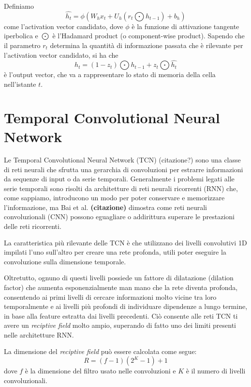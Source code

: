 Definiamo
\begin{equation}
	\hat{h_{t}} = \phi(W_{h}x_{t}+U_{h}(r_{t} \bigodot h_{t-1})+b_{h})
\end{equation}
come l'activation vector candidato, dove $\phi$ è la funzione di attivazione tangente iperbolica e $\bigodot$ è l'Hadamard product (o component-wise product).
Sapendo che il parametro $r_{t}$ determina la quantità di informazione passata che è rilevante per l'activation vector candidato, si ha che
\begin{equation}
	h_{t} = (1-z_{t}) \bigodot h_{t-1}+z_{t} \bigodot \hat{h_{t}} 
\end{equation}
è l'output vector, che va a rappresentare lo stato di memoria della cella nell'istante $t$.

\section{Temporal Convolutional Neural Network}
Le Temporal Convolutional Neural Network (TCN) (citazione?) sono una classe di reti neurali che sfrutta una gerarchia di convoluzioni per estrarre informazioni da sequenze di input o da serie temporali.
Generalmente i problemi legati alle serie temporali sono risolti da architetture di reti neurali ricorrenti (RNN) che, come sappiamo, introducono un modo per poter conservare e memorizzare l'informazione, ma Bai et al. \textbf{(citazione)} dimostra come reti neurali convoluzionali (CNN) possono eguagliare o addirittura superare le prestazioni delle reti ricorrenti.

La caratteristica più rilevante delle TCN è che utilizzano dei livelli convolutivi 1D impilati l'uno sull'altro per creare una rete profonda, utili poter eseguire la convoluzione sulla dimensione temporale.

Oltretutto, ognuno di questi livelli possiede un fattore di dilatazione (dilation factor) che aumenta esponenzialmente man mano che la rete diventa profonda, consentendo ai primi livelli di cercare informazioni molto vicine tra loro temporalmente e ai livelli più profondi di individuare dipendenze a lungo termine, in base alla feature estratta dai livelli precedenti. Ciò consente alle reti TCN ti avere un \textit{reciptive field} molto ampio, superando di fatto uno dei limiti presenti nelle architetture RNN. 

La dimensione del \textit{reciptive field} può essere calcolata come segue:
\begin{equation}
	R = (f-1)(2^K-1)+1
\end{equation}
dove $f$ è la dimensione del filtro usato nelle convoluzioni e $K$ è il numero di livelli convoluzionali.

